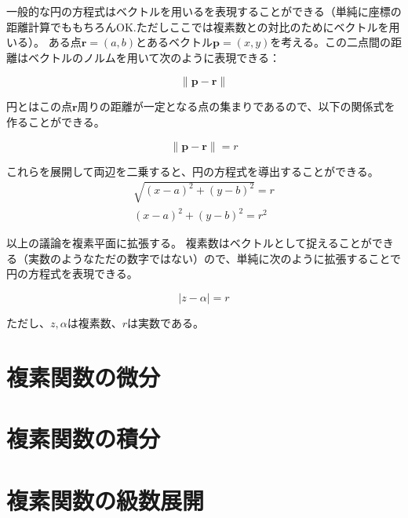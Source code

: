 \documentclass[a4j,10t]{jreport}
\begin{document}
一般的な円の方程式はベクトルを用いるを表現することができる（単純に座標の距離計算でももちろんOK.ただしここでは複素数との対比のためにベクトルを用いる）。
ある点$\bm{r}=(a,b)$とあるベクトル$\bm{p}=(x,y)$を考える。この二点間の距離はベクトルのノルムを用いて次のように表現できる：

\begin{equation}
  \|\bm{p}-\bm{r}\|
\end{equation}

円とはこの点$\bm{r}$周りの距離が一定となる点の集まりであるので、以下の関係式を作ることができる。

\begin{equation}
  \|\bm{p}-\bm{r}\| = r
\end{equation}

これらを展開して両辺を二乗すると、円の方程式を導出することができる。
\begin{eqnarray}
  \sqrt{(x-a)^2+(y-b)^2} = r \\
  (x-a)^2+(y-b)^2 = r^2
\end{eqnarray}

以上の議論を複素平面に拡張する。
複素数はベクトルとして捉えることができる（実数のようなただの数字ではない）ので、単純に次のように拡張することで円の方程式を表現できる。

\begin{equation}
  |z-\alpha|=r
\end{equation}

ただし、$z,\alpha$は複素数、$r$は実数である。

\chapter{複素関数の微分}
\chapter{複素関数の積分}
\chapter{複素関数の級数展開}
\end{document}
